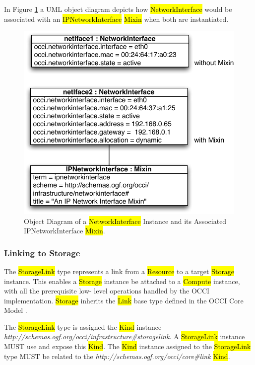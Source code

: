 \documentclass[10pt,a4paper]{article}
\begin{document}
In Figure \ref{fig:networkinterface_mixin} a UML object diagram depicts how \hl{NetworkInterface} 
would be associated with an \hl{IPNetworkInterface} \hl{Mixin} when both are instantiated.

\begin{figure}[!h]
	\centering
	\includegraphics[scale=0.5]{figs/infrastructure_mixins_obj_dia2_networkinterface}
	\caption{Object Diagram of a \hl{NetworkInterface} Instance and its Associated 
	IPNetworkInterface \hl{Mixin}.}
	\label{fig:networkinterface_mixin}
\end{figure}

\subsubsection{Linking to Storage}
The \hl{StorageLink} type represents a link from a \hl{Resource} to a target \hl{Storage} instance. This 
enables a \hl{Storage} instance be attached to a \hl{Compute} instance, with all the prerequisite low-
level operations handled by the OCCI implementation.
%
\hl{Storage} inherits the \hl{Link} base type defined in the OCCI Core Model
\cite{occi:core}.

The \hl{StorageLink} type is assigned the \hl{Kind} instance 
\textit{http://schemas.ogf.org/occi/infrastructure\#storagelink}.
A \hl{StorageLink} instance MUST use and expose this \hl{Kind}. 
%
The \hl{Kind} instance assigned to the \hl{StorageLink} type MUST be related to
the \textit{http://schemas.ogf.org/occi/core\#link} \hl{Kind}.
\end{document}
